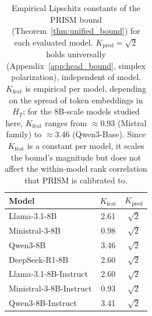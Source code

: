 \begin{table}[t]
\centering
\caption{Empirical Lipschitz constants of the PRISM bound (Theorem~\ref{thm:unified_bound}) for each evaluated model. $K_{\mathrm{pred}} = \sqrt{2}$ holds universally (Appendix~\ref{app:head_bound}, simplex polarization), independent of model. $K_{\mathrm{feat}}$ is empirical per model, depending on the spread of token embeddings in $H_T$; for the 8B-scale models studied here, $K_{\mathrm{feat}}$ ranges from $\approx 0.93$ (Mistral family) to $\approx 3.46$ (Qwen3-Base). Since $K_{\mathrm{feat}}$ is a constant per model, it scales the bound's magnitude but does not affect the within-model rank correlation that PRISM is calibrated to.}
\label{tab:lipschitz_constants}
\setlength{\tabcolsep}{8pt}
\begin{tabular}{l cc}
\toprule
Model & $K_{\mathrm{feat}}$ & $K_{\mathrm{pred}}$ \\
\midrule
Llama-3.1-8B & 2.61 & $\sqrt{2}$ \\
Ministral-3-8B & 0.98 & $\sqrt{2}$ \\
Qwen3-8B & 3.46 & $\sqrt{2}$ \\
DeepSeek-R1-8B & 2.60 & $\sqrt{2}$ \\
Llama-3.1-8B-Instruct & 2.60 & $\sqrt{2}$ \\
Ministral-3-8B-Instruct & 0.93 & $\sqrt{2}$ \\
Qwen3-8B-Instruct & 3.41 & $\sqrt{2}$ \\
\bottomrule
\end{tabular}
\end{table}